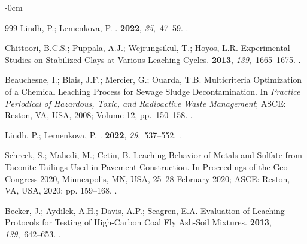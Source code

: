 \documentclass[algorithms,article,accept,pdftex,moreauthors]{Definitions/mdpi}
\begin{document}
\begin{adjustwidth}{-\extralength}{0cm}
\begin{thebibliography}{999}
\clearpage 
{}
Lindh, P.; Lemenkova, P.
.
 {\bf 2022}, {\em 35},~47--59.
.

Chittoori, B.C.S.; Puppala, A.J.; Wejrungsikul, T.; Hoyos, L.R.
\newblock Experimental Studies on Stabilized Clays at Various Leaching Cycles.
 {\bf
  2013}, {\em 139},~1665--1675.
.

Beauchesne, I.; Blais, J.F.; Mercier, G.; Ouarda, T.B.
\newblock Multicriteria Optimization of a Chemical Leaching Process for Sewage
  Sludge Decontamination.
\newblock In {\em Practice Periodical of Hazardous, Toxic, and Radioactive Waste
  Management}; ASCE: Reston, VA, USA, 2008; {Volume 12}, pp.~150--158. %
.

Lindh, P.; Lemenkova, P.
.
 {\bf 2022}, {\em
  29},~537--552.
.

Schreck, S.; Mahedi, M.; Cetin, B. Leaching Behavior of Metals and Sulfate
  from Taconite Tailings Used in Pavement Construction.
\newblock In Proceedings of the  Geo-Congress 2020, Minneapolis, MN, USA, 25--28 February 2020; ASCE: Reston, VA, USA,  2020; pp. 159--168. %
.

Becker, J.; Aydilek, A.H.; Davis, A.P.; Seagren, E.A.
\newblock Evaluation of Leaching Protocols for Testing of High-Carbon Coal Fly
  Ash-Soil Mixtures.
 {\bf 2013}, {\em
  139},~642--653.
.


\end{thebibliography}
\end{adjustwidth}
\end{document}
